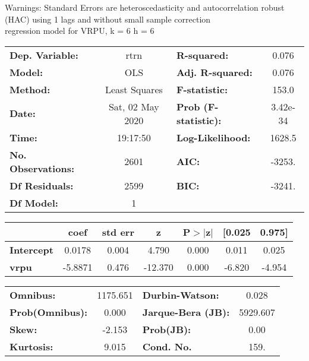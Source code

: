 Warnings: \newline
 [1] Standard Errors are heteroscedasticity and autocorrelation robust (HAC) using 1 lags and without small sample correction\\ 

regression model for VRPU, k = 6 h = 6\begin{center}
\begin{tabular}{lclc}
\toprule
\textbf{Dep. Variable:}    &       rtrn       & \textbf{  R-squared:         } &     0.076   \\
\textbf{Model:}            &       OLS        & \textbf{  Adj. R-squared:    } &     0.076   \\
\textbf{Method:}           &  Least Squares   & \textbf{  F-statistic:       } &     153.0   \\
\textbf{Date:}             & Sat, 02 May 2020 & \textbf{  Prob (F-statistic):} &  3.42e-34   \\
\textbf{Time:}             &     19:17:50     & \textbf{  Log-Likelihood:    } &    1628.5   \\
\textbf{No. Observations:} &        2601      & \textbf{  AIC:               } &    -3253.   \\
\textbf{Df Residuals:}     &        2599      & \textbf{  BIC:               } &    -3241.   \\
\textbf{Df Model:}         &           1      & \textbf{                     } &             \\
\bottomrule
\end{tabular}
\begin{tabular}{lcccccc}
                   & \textbf{coef} & \textbf{std err} & \textbf{z} & \textbf{P$> |$z$|$} & \textbf{[0.025} & \textbf{0.975]}  \\
\midrule
\textbf{Intercept} &       0.0178  &        0.004     &     4.790  &         0.000        &        0.011    &        0.025     \\
\textbf{vrpu}      &      -5.8871  &        0.476     &   -12.370  &         0.000        &       -6.820    &       -4.954     \\
\bottomrule
\end{tabular}
\begin{tabular}{lclc}
\textbf{Omnibus:}       & 1175.651 & \textbf{  Durbin-Watson:     } &    0.028  \\
\textbf{Prob(Omnibus):} &   0.000  & \textbf{  Jarque-Bera (JB):  } & 5929.607  \\
\textbf{Skew:}          &  -2.153  & \textbf{  Prob(JB):          } &     0.00  \\
\textbf{Kurtosis:}      &   9.015  & \textbf{  Cond. No.          } &     159.  \\
\bottomrule
\end{tabular}
\end{center}

